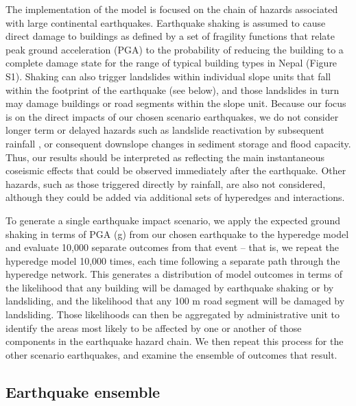 \documentclass[preprint,12pt,authoryear]{elsarticle}
\begin{document}
The implementation of the model is focused on the chain of hazards associated with large continental earthquakes. Earthquake shaking is assumed to cause direct damage to buildings as defined by a set of fragility functions that relate peak ground acceleration (PGA) to the probability of reducing the building to a complete damage state for the range of typical building types in Nepal (Figure S1). Shaking can also trigger landslides within individual slope units that fall within the footprint of the earthquake (see below), and those landslides in turn may damage buildings or road segments within the slope unit. Because our focus is on the direct impacts of our chosen scenario earthquakes, we do not consider longer term or delayed hazards such as landslide reactivation by subsequent rainfall \citep{Fan2019,Kincey2021}, or consequent downslope changes in sediment storage and flood capacity. Thus, our results should be interpreted as reflecting the main instantaneous coseismic effects that could be observed immediately after the earthquake. Other hazards, such as those triggered directly by rainfall, are also not considered, although they could be added via additional sets of hyperedges and interactions.

To generate a single earthquake impact scenario, we apply the expected ground shaking in terms of PGA (g) from our chosen earthquake to the hyperedge model and evaluate 10,000 separate outcomes from that event -- that is, we repeat the hyperedge model 10,000 times, each time following a separate path through the hyperedge network. This generates a distribution of model outcomes in terms of the likelihood that any building will be damaged by earthquake shaking or by landsliding, and the likelihood that any 100 m road segment will be damaged by landsliding. Those likelihoods can then be aggregated by administrative unit to identify the areas most likely to be affected by one or another of those components in the earthquake hazard chain. We then repeat this process for the other scenario earthquakes, and examine the ensemble of outcomes that result.

\subsection{Earthquake ensemble}
\end{document}
